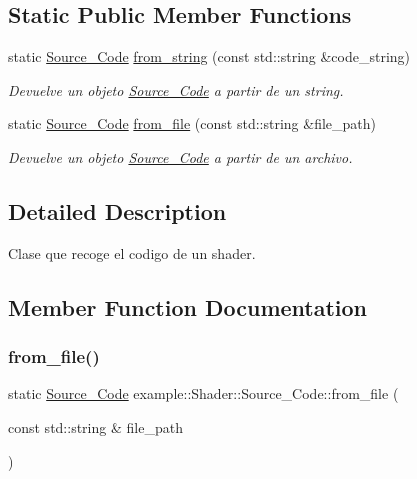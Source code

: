 \subsection*{Static Public Member Functions}
\begin{DoxyCompactItemize}
\item 
static \mbox{\hyperlink{classexample_1_1_shader_1_1_source___code}{Source\+\_\+\+Code}} \mbox{\hyperlink{classexample_1_1_shader_1_1_source___code_a81c2e0da8c100613612f9e78302d74d3}{from\+\_\+string}} (const std\+::string \&code\+\_\+string)
\begin{DoxyCompactList}\small\item\em Devuelve un objeto \mbox{\hyperlink{classexample_1_1_shader_1_1_source___code}{Source\+\_\+\+Code}} a partir de un string. \end{DoxyCompactList}\item 
static \mbox{\hyperlink{classexample_1_1_shader_1_1_source___code}{Source\+\_\+\+Code}} \mbox{\hyperlink{classexample_1_1_shader_1_1_source___code_ad6a459c381ded3e246890b7a7e99bc42}{from\+\_\+file}} (const std\+::string \&file\+\_\+path)
\begin{DoxyCompactList}\small\item\em Devuelve un objeto \mbox{\hyperlink{classexample_1_1_shader_1_1_source___code}{Source\+\_\+\+Code}} a partir de un archivo. \end{DoxyCompactList}\end{DoxyCompactItemize}


\subsection{Detailed Description}
Clase que recoge el codigo de un shader. 



\subsection{Member Function Documentation}
\mbox{\label{classexample_1_1_shader_1_1_source___code_ad6a459c381ded3e246890b7a7e99bc42}} 
\subsubsection{\texorpdfstring{from\_file()}{from\_file()}}
{\footnotesize\ttfamily static \mbox{\hyperlink{classexample_1_1_shader_1_1_source___code}{Source\+\_\+\+Code}} example\+::\+Shader\+::\+Source\+\_\+\+Code\+::from\+\_\+file (\begin{DoxyParamCaption}\item[{const std\+::string \&}]{file\+\_\+path }\end{DoxyParamCaption})\hspace{0.3cm}{\ttfamily [static]}}



